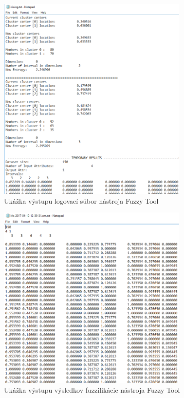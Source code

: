 \begin{figure}[h]
\includegraphics[width=0.85\textwidth]{obrazky/logSubor.PNG}
\centering
\caption{Ukážka výstupu logovací súbor nástroja Fuzzy Tool} 
\label{fig:logSubor}
\end{figure}

\begin{figure}[h]
\includegraphics[width=0.85\textwidth]{obrazky/vysledkySubor.PNG}
\centering
\caption{Ukážka výstupu výsledkov fuzzifikácie nástroja Fuzzy Tool} 
\label{fig:vysledky}
\end{figure}

